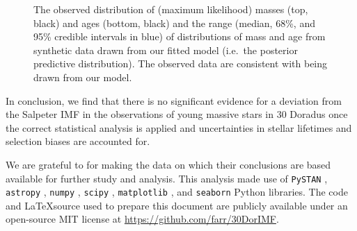 \documentclass[apjl]{emulateapj}
\newcommand{\MSun}{M_\odot}
\begin{document}
\begin{figure}
    		\caption{The observed distribution of (maximum likelihood) masses (top, black) and ages (bottom, black) and the range (median, 68\%, and 95\% credible intervals in blue) of distributions of mass and age from synthetic data drawn from our fitted model (i.e.\ the posterior predictive distribution).  The observed data are consistent with being drawn from our model.  %
		}\label{fig:PPC}
\end{figure}


In conclusion, we find that there is no significant evidence for a deviation from the Salpeter IMF \citep{Salpeter:1955} in the observations of young massive stars in 30 Doradus once the correct statistical analysis is applied and uncertainties in stellar lifetimes and selection biases are accounted for.

\acknowledgments

We are grateful to \citet{Schneider:2018} for making the data on which their conclusions are
based available for further study and analysis.  This analysis made use of \texttt{PySTAN} \citep{PySTAN}, \texttt{astropy} \citep{astropy}, \texttt{numpy} \citep{numpy}, \texttt{scipy} \citep{scipy}, \texttt{matplotlib} \citep{matplotlib}, and \texttt{seaborn} \citep{seaborn} Python libraries.  The code and \LaTeX source used to prepare this document are publicly available under an open-source MIT license at \url{https://github.com/farr/30DorIMF}.



\end{document}
